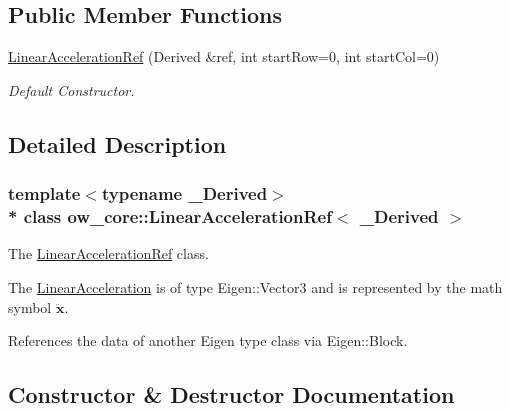\subsection*{Public Member Functions}
\begin{DoxyCompactItemize}
\item 
\hyperlink{classow__core_1_1LinearAccelerationRef_a16b61c66d54fcc5e59eef31489dc2c4a}{Linear\+Acceleration\+Ref} (Derived \&ref, int start\+Row=0, int start\+Col=0)
\begin{DoxyCompactList}\small\item\em Default Constructor. \end{DoxyCompactList}\end{DoxyCompactItemize}


\subsection{Detailed Description}
\subsubsection*{template$<$typename \+\_\+\+Derived$>$\\*
class ow\+\_\+core\+::\+Linear\+Acceleration\+Ref$<$ \+\_\+\+Derived $>$}

The \hyperlink{classow__core_1_1LinearAccelerationRef}{Linear\+Acceleration\+Ref} class. 

The \hyperlink{classow__core_1_1LinearAcceleration}{Linear\+Acceleration} is of type Eigen\+::\+Vector3 and is represented by the math symbol $\ddot{\mathbf{x}}$.

References the data of another Eigen type class via Eigen\+::\+Block. 

\subsection{Constructor \& Destructor Documentation}
